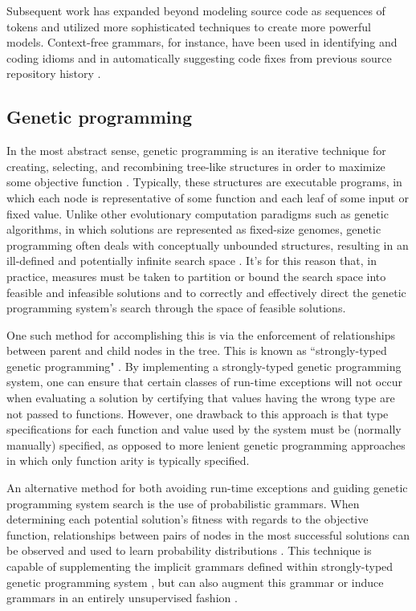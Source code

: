 \documentclass[a4paper,11pt]{proposal}
\begin{document}
Subsequent work has expanded beyond modeling source code as sequences of tokens and utilized more sophisticated techniques to create more powerful models. Context-free grammars, for instance, have been used in identifying and coding idioms \cite{allamanis2014} and in automatically suggesting code fixes from previous source repository history \cite{bomersbach2014}.


\subsection{Genetic programming}

In the most abstract sense, genetic programming is an iterative technique for creating, selecting, and recombining tree-like structures in order to maximize some objective function \cite{poli2008field}. Typically, these structures are executable programs, in which each node is representative of some function and each leaf of some input or fixed value. Unlike other evolutionary computation paradigms such as genetic algorithms, in which solutions are represented as fixed-size genomes, genetic programming often deals with conceptually unbounded structures, resulting in an ill-defined and potentially infinite search space \cite{shan2006}. It's for this reason that, in practice, measures must be taken to partition or bound the search space into feasible and infeasible solutions and to correctly and effectively direct the genetic programming system's search through the space of feasible solutions.

One such method for accomplishing this is via the enforcement of relationships between parent and child nodes in the tree. This is known as ``strongly-typed genetic programming" \cite{montana1995}. By implementing a strongly-typed genetic programming system, one can ensure that certain classes of run-time exceptions will not occur when evaluating a solution by certifying that values having the wrong type are not passed to functions. However, one drawback to this approach is that type specifications for each function and value used by the system must be (normally manually) specified, as opposed to more lenient genetic programming approaches in which only function arity is typically specified. 

An alternative method for both avoiding run-time exceptions and guiding genetic programming system search is the use of probabilistic grammars. When determining each potential solution's fitness with regards to the objective function, relationships between pairs of nodes in the most successful solutions can be observed and used to learn probability distributions \cite{poli2008field}. This technique is capable of supplementing the implicit grammars defined within strongly-typed genetic programming system \cite{ratle2001} \cite{whigham1995}, but can also augment this grammar \cite{whigham1995inductive} or induce grammars in an entirely unsupervised fashion \cite{tanev2004}.
\end{document}
